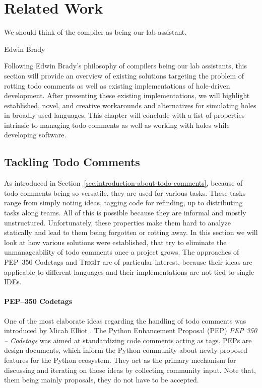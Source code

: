 \chapter{Related Work}
\label{cha:related-work}
\epigraph{We should think of the compiler as being our lab assistant.}{Edwin Brady}

\noindent
Following Edwin Brady's philosophy of compilers being our lab assistants, this section will provide an overview of existing solutions targeting the problem of rotting todo comments as well as existing implementations of hole-driven development.
After presenting these existing implementations, we will highlight established, novel, and creative workarounds and alternatives for simulating holes in broadly used languages.
This chapter will conclude with a list of properties intrinsic to managing todo-comments as well as working with holes while developing software.

\section{Tackling Todo Comments}
\label{sec:tackling-todo-comments}
As introduced in Section~\ref{sec:introduction-about-todo-comments}, because of todo comments being so versatile, they are used for various tasks.
These tasks range from simply noting ideas, tagging code for refinding, up to distributing tasks along teams.
All of this is possible because they are informal and mostly unstructured.
Unfortunately, these properties make them hard to analyze statically and lead to them being forgotten or rotting away.
In this section we will look at how various solutions were established, that try to eliminate the unmanageability of todo comments once a project grows.
The approaches of PEP--350 Codetags and \textsc{TrigIt} are of particular interest, because their ideas are applicable to different languages and their implementations are not tied to single IDEs.

\subsubsection{PEP--350 Codetags}
\label{sec:codetags}
One of the most elaborate ideas regarding the handling of todo comments was introduced by Micah Elliot \cite{elliott_pep_2005}.
The Python Enhancement Proposal (PEP) \emph{PEP 350 -- Codetags} was aimed at standardizing code comments acting as tags.
PEPs are design documents, which inform the Python community about newly proposed features for the Python ecosystem.
They act as the primary mechanism for discussing and iterating on those ideas by collecting community input.
Note that, them being mainly proposals, they do not have to be accepted.

